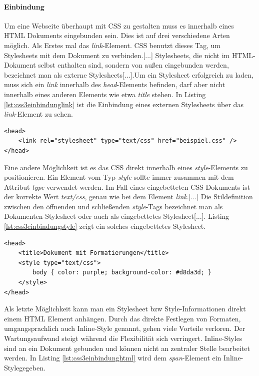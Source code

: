 \documentclass[12pt,a4paper,bibliography=totocnumbered,listof=totocnumbered]{scrartcl}
\begin{document}
\paragraph{Einbindung} Um eine Webseite überhaupt mit CSS zu gestalten muss es innerhalb eines HTML Dokuments eingebunden sein. Dies ist auf drei verschiedene Arten möglich. Als Erstes mal das \textit{link}-Element. \glqq CSS benutzt dieses Tag, um Stylesheets mit dem Dokument zu verbinden.[...] Stylesheets, die nicht im HTML-Dokument selbst enthalten sind, sondern von außen eingebunden werden, bezeichnet man als externe Stylesheets[...].Um ein Stylesheet erfolgreich zu laden, muss sich ein \textit{link} innerhalb des \textit{head}-Elements befinden, darf aber nicht innerhalb eines anderen Elements wie etwa \textit{title} stehen.\grqq{}\cite[S.14]{MeyeCasc2005} In Listing \ref{lst:css3einbindunglink} ist die Einbindung eines externen Stylesheets über das \textit{link}-Element zu sehen.
	
	\vspace{1em}
	\begin{lstlisting}[caption=Stylesheet Einbindung über \textit{link}-Element, label=lst:css3einbindunglink]
<head>
    <link rel="stylesheet" type="text/css" href="beispiel.css" />
</head>
	\end{lstlisting}

Eine andere Möglichkeit ist es das CSS direkt innerhalb eines \textit{style}-Elements zu positionieren. Ein Element vom Typ \glqq \textit{style} sollte immer zusammen mit dem Attribut \textit{type} verwendet werden. Im Fall eines eingebetteten CSS-Dokuments ist der korrekte Wert \glqq \textit{text/css}\grqq, genau wie bei dem Element \textit{link}.[...] Die Stildefinition zwischen den öffnenden und schließenden \textit{style}-Tags bezeichnet man als Dokumenten-Stylesheet oder auch als eingebettetes Stylesheet[...].\grqq{}\cite[S.19]{MeyeCasc2005} Listing \ref{lst:css3einbindungstyle} zeigt ein solches eingebettetes Stylesheet.

	\vspace{1em}
	\begin{lstlisting}[caption=Stylesheet Einbindung über \textit{style}-Element, label=lst:css3einbindungstyle]
<head>
	<title>Dokument mit Formatierungen</title>
	<style type="text/css">
		body { color: purple; background-color: #d8da3d; }
	</style>
</head>
	\end{lstlisting}
	
Als letzte Möglichkeit kann man ein Stylesheet bzw Style-Informationen direkt einem HTML Element anhängen. \glqq Durch das direkte Festlegen von Formaten, umgangsprachlich auch \glqq Inline-Style\grqq{} genannt, gehen viele Vorteile verloren. Der Wartungsaufwand steigt während die Flexibilität sich verringert. Inline-Styles sind an ein Dokument gebunden und können nicht an zentraler Stelle bearbeitet werden.\grqq{}\cite{SelfHtml20144} In Listing \ref{lst:css3einbindunghtml} wird dem \textit{span}-Element ein \glqq Inline-Style\grqq gegeben.
\end{document}
